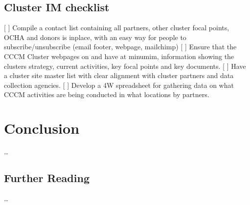 \documentclass[letterpaper,10pt,english]{jupyterBook}
\begin{document}
\section{Cluster IM checklist}
\label{\detokenize{part3/products:cluster-im-checklist}}
\sphinxAtStartPar
{[} {]} Compile a contact list containing all partners, other cluster focal points, OCHA and donors is in\sphinxhyphen{}place, with an easy way for people to subscribe/unsubscribe (email footer, webpage, mailchimp)
{[} {]} Ensure that the CCCM Cluster webpages on  and  have at minumim, information showing the clusters strategy, current activities, key focal points and key documents.
{[} {]} Have a cluster site master list with clear alignment with cluster partners and data collection agencies.
{[} {]} Develop a 4W spreadsheet for gathering data on what CCCM activities are being conducted in what locations by partners.


\chapter{Conclusion}
\label{\detokenize{conclusion:conclusion}}\label{\detokenize{conclusion::doc}}
\sphinxAtStartPar
…


\section{Further Reading}
\label{\detokenize{conclusion:further-reading}}
\sphinxAtStartPar
…







\renewcommand{\indexname}{Index}
\printindex
\end{document}

